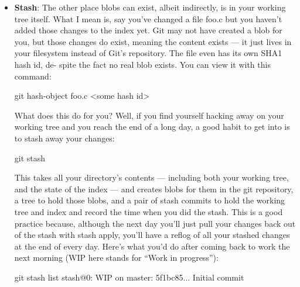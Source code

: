 \documentclass{report}
\begin{document}
\begin{itemize}
\begin{bashcode}
            5f1bc85... HEAD@{0}: commit (initial): Initial commit
            \end{bashcode}
            \bigbreak \noindent 
            The beauty of the reflog is that it persists independently of other changes in your repository. This means I could unlink the above commit from my repository (using reset), yet it would still be referenced by the reflog for another 30 days, protecting it from garbage collection. This gives me a month’s chance to recover the commit should I discover I really need it.
        \item \textbf{Stash}: The other place blobs can exist, albeit indirectly, is in your working tree itself. What I mean is, say you’ve changed a file foo.c but you haven’t added those changes to the index yet. Git may not have created a blob for you, but those changes do exist, meaning the content exists — it just lives in your filesystem instead of Git’s repository. The file even has its own SHA1 hash id, de- spite the fact no real blob exists. You can view it with this command:
            \bigbreak \noindent 
            \begin{bashcode}
            git hash-object foo.c
            <some hash id>
            \end{bashcode}
            \bigbreak \noindent 
            What does this do for you? Well, if you find yourself hacking away on your working tree and you reach the end of a long day, a good habit to get into is to stash away your changes:
            \bigbreak \noindent 
            \begin{bashcode}
            git stash
            \end{bashcode}
            \bigbreak \noindent 
            This takes all your directory’s contents — including both your working tree, and the state of the index — and creates blobs for them in the git repository, a tree to hold those blobs, and a pair of stash commits to hold the working tree and index and record the time when you did the stash.
            \bigbreak \noindent 
            This is a good practice because, although the next day you’ll just pull your changes back out of the stash with stash apply, you’ll have a reflog of all your stashed changes at the end of every day. Here’s what you’d do after coming back to work the next morning (WIP here stands for “Work in progress”):
            \bigbreak \noindent 
            \begin{bashcode}
                git stash list
                stash@{0}: WIP on master: 5f1bc85... Initial commit


\end{bashcode}
\end{itemize}
\end{document}
